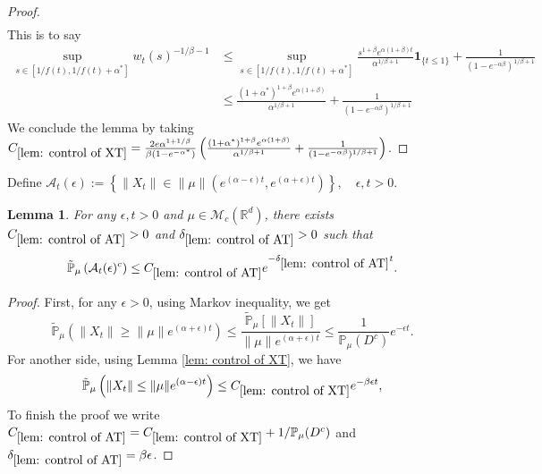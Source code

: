\documentclass[12pt,oneside,english]{amsart}
\theoremstyle{plain}
\newtheorem{lem}[thm]{Lemma}
\theoremstyle{definition}
\numberwithin{equation}{section}
\begin{document}
\begin{proof}
\begin{align*}
\end{align*}
This is to say
\begin{align*}
    \sup_{s\in [1/f(t),1/f(t)+\alpha^*]}w_t(s)^{-1/\beta-1}&\leq\sup_{s\in [1/f(t),1/f(t)+\alpha^*]}\frac{s^{1+\beta}e^{\alpha(1+\beta)t}}{\alpha^{1/\beta +1}}\mathbf{1}_{\{t\leq 1\}}+\frac{1}{(1-e^{-\alpha\beta })^{1/\beta+1}}\\
    &\leq \frac{(1+\alpha^*)^{1+\beta}e^{\alpha(1+\beta)}}{\alpha^{1/\beta+1}}+\frac{1}{(1-e^{-\alpha\beta })^{1/\beta+1}}
\end{align*}
We conclude the lemma by taking $C_{\ref{lem: control of XT}}= \frac{2 e \alpha^{1+1/\beta}}{\beta (1-e^{-\alpha^*})}\left(\frac{(1+\alpha^*)^{1+\beta}e^{\alpha(1+\beta)}}{\alpha^{1/\beta+1}}+\frac{1}{(1-e^{-\alpha\beta })^{1/\beta+1}}\right)$.
\end{proof}
Define $\mathcal{A}_t(\epsilon):=\left\{ \|X_t\|\in \|\mu\|\left(e^{(\alpha-\epsilon)t},e^{(\alpha+\epsilon)t}\right)\right\},\quad \epsilon,t>0$.
\begin{lem}\label{lem: control of AT}
  For any $\epsilon,t>0$ and $\mu \in \mathcal{M}_c(\mathbb{R}^d)$, there exists $C_{\ref{lem: control of AT}}>0$ and $\delta_{\ref{lem: control of AT}}>0$ such that
  $$\mathbb{\tilde{P}}_{\mu}\left(\mathcal{A}_t(\epsilon)^c\right)\leq C_{\ref{lem: control of AT}} e^{-\delta_{\ref{lem: control of AT}} t}.$$
\end{lem}

\begin{proof}
    First, for any $\epsilon>0$, using Markov inequality, we get
    $$\mathbb{\tilde{P}}_{\mu}(\|X_t\|\geq\|\mu\|e^{(\alpha+\epsilon)t})\leq\frac{\mathbb{\tilde{P}}_{\mu}[\|X_t\|]}{\|\mu\|e^{(\alpha+\epsilon)t}}\leq \frac{1}{\mathbb{P}_{\mu}(D^c)}e^{-\epsilon t}.$$
    For another side, using Lemma \ref{lem: control of XT}, we have
    $$\mathbb{\tilde{P}}_{\mu}\left(\|X_t\|\leq \|\mu\|e^{(\alpha-\epsilon)t}\right)\leq C_{\ref{lem: control of XT}} e^{-\beta\epsilon t}, $$
To finish the proof we write $C_{\ref{lem: control of AT}}=C_{\ref{lem: control of XT}}+1/\mathbb{P}_{\mu}(D^c)$ and $\delta_{\ref{lem: control of AT}}=\beta\epsilon $.
\begin{comment}
\begin{align*}
    \mathbb{\tilde{P}}_{\mu}\left(\mathcal{A}_t(\epsilon)^c\right)\leq \mathbb{\tilde{P}}_{\mu}(\|X_t\|\geq\|\mu\|e^{(\alpha+\epsilon)t})+\mathbb{P}_{\mu}\left(\|X_t\|\leq \|\mu\|e^{(\alpha-\epsilon)t}\right)\leq(C_4+\frac{1}{\mathbb{P}_{\mu}(D^c)})e^{-\beta \epsilon t }
\end{align*}
\end{comment}
\end{proof}
\end{document}

